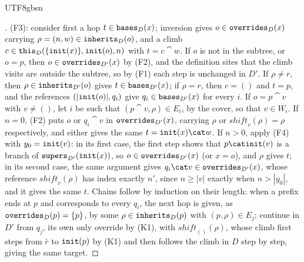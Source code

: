 \begin{CJK*}{UTF8}{gbsn}
\begin{proof}[]
\begin{sloppypar}
(F3): consider first a hop $t \in \mathtt{bases}_D(x)$; inversion gives $o \in \mathtt{overrides}_D(x)$ carrying
$\rho = (n, w) \in \mathtt{inherits}_D(o)$, and a climb $c \in \mathtt{this}_D(\{\mathtt{init}(x)\}, \mathtt{init}(o), n)$ with
$t = c \cat w$. If $o$ is not in the subtree, or $o = p$, then $o \in \mathtt{overrides}_{D'}(x)$ by (F2), and the
definition sites that the climb visits are outside the subtree, so by (F1) each step is unchanged in
$D'$. If $\rho \ne r$, then $\rho \in \mathtt{inherits}_{D'}(o)$ gives $t \in \mathtt{bases}_{D'}(x)$; if $\rho = r$, then
$c = ()$ and $t = p$, and the references $(|\mathtt{init}(o)|, q_i)$ give $q_i \in \mathtt{bases}_{D'}(x)$ for every $i$.
If $o = p \cat v$ with $v \ne ()$, let $i$ be such that $(p \cat v, \rho) \in E_i$, by the cover, so
that $v \in W_i$. If $n = 0$, (F2) puts $o$ or $q_i \cat v$ in $\mathtt{overrides}_{D'}(x)$, carrying
$\rho$ or $\mathit{shift}_v(\rho) = \rho$ respectively, and either gives the same $t = \init(x) \cat w$. If
$n > 0$, apply (F4) with $y_0 = \mathtt{init}(v)$: in its first case, the first step shows that $p \cat \init(v)$ is
a branch of $\mathtt{supers}_{D'}(\mathtt{init}(x))$, so $o \in \mathtt{overrides}_{D'}(x)$ (or $x = o$), and $\rho$ gives $t$; in
its second case, the same argument gives $q_i \cat v \in \overrides_{D'}(x)$, whose reference
$\mathit{shift}_v(\rho)$ has index exactly $n'$, since $n \ge |v|$ exactly when $n > |y_0|$, and it gives
the same $t$. Chains follow by induction on their length: when a prefix ends at $p$ and corresponds to
every $q_i$, the next hop is given, as $\mathtt{overrides}_D(p) = \{p\}$, by some $\rho \in \mathtt{inherits}_D(p)$
with $(p, \rho) \in E_j$; continue in $D'$ from $q_j$, its own only override by (K1), with
$\mathit{shift}_{()}(\rho)$, whose climb first steps from $\bar r$ to $\mathtt{init}(p)$ by (K1) and then follows
the climb in $D$ step by step, giving the same target.


\end{sloppypar}
\end{proof}
\end{CJK*}
